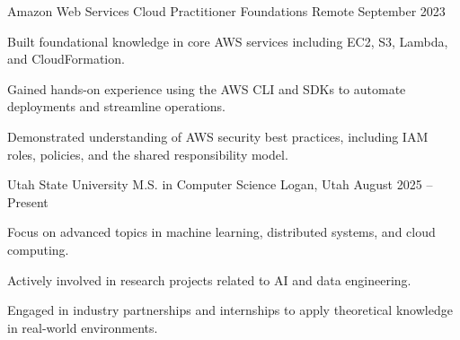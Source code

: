 \documentclass[10pt, a4paper]{russell}
\begin{document}
\begin{cventries}
    \cventry
        {Amazon Web Services}
        {Cloud Practitioner Foundations}
        {Remote}
        {September 2023}
        {
            \begin{cvitems}
                \item Built foundational knowledge in core AWS services including EC2, S3, Lambda, and CloudFormation.
                \item Gained hands-on experience using the AWS CLI and SDKs to automate deployments and streamline operations.
                \item Demonstrated understanding of AWS security best practices, including IAM roles, policies, and the shared responsibility model.
            \end{cvitems}
        }
\end{cventries}

\begin{cventries}
     \cventry
        {Utah State University}
        {M.S. in Computer Science}
        {Logan, Utah}
        {August 2025 – Present}
        {
            \begin{cvitems}
                \item Focus on advanced topics in machine learning, distributed systems, and cloud computing.
                \item Actively involved in research projects related to AI and data engineering.
                \item Engaged in industry partnerships and internships to apply theoretical knowledge in real-world environments.
            \end{cvitems}
        }
\end{cventries}

\vspace*{\fill}
\end{document}
